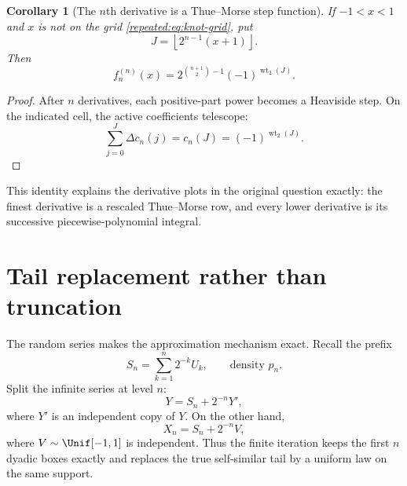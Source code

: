 \documentclass[11pt,oneside]{article}
\newtheorem{corollary}[theorem]{Corollary}
\theoremstyle{definition}
\theoremstyle{remark}
\newcommand{\wt}{\operatorname{wt}_2}
\begin{document}
\begin{corollary}[The $n$th derivative is a Thue--Morse step function]
\label{repeated:cor:nth-derivative}
If $-1<x<1$ and $x$ is not on the grid \eqref{repeated:eq:knot-grid}, put
\begin{equation}
 J=\left\lfloor2^{n-1}(x+1)\right\rfloor.
\end{equation}
Then
\begin{equation}
 f_n^{(n)}(x)=2^{\binom{n+1}{2}-1}(-1)^{\wt(J)}.            \label{repeated:eq:nth-derivative}
\end{equation}
\end{corollary}

\begin{proof}
After $n$ derivatives, each positive-part power becomes a Heaviside step.  On the indicated
cell, the active coefficients telescope:
\[
 \sum_{j=0}^{J}\Delta c_n(j)=c_n(J)=(-1)^{\wt(J)}.
\]
\end{proof}

This identity explains the derivative plots in the original question exactly: the finest
derivative is a rescaled Thue--Morse row, and every lower derivative is its successive
piecewise-polynomial integral.

\section{Tail replacement rather than truncation}
\label{repeated:sec:tail-replacement}

The random series makes the approximation mechanism exact.  Recall the prefix
\begin{equation}
 S_n=\sum_{k=1}^{n}2^{-k}U_k,
 \qquad \text{density }p_n.                                \label{repeated:eq:Sn}
\end{equation}
Split the infinite series at level $n$:
\begin{equation}
 Y=S_n+2^{-n}Y',                                           \label{repeated:eq:Y-tail}
\end{equation}
where $Y'$ is an independent copy of $Y$.  On the other hand,
\begin{equation}
 X_n=S_n+2^{-n}V,                                          \label{repeated:eq:X-tail}
\end{equation}
where $V\sim\Unif[-1,1]$ is independent.  Thus the finite iteration keeps the first $n$
dyadic boxes exactly and replaces the true self-similar tail by a uniform law on the same
support.
\end{document}
